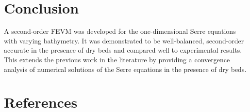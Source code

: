 \documentclass[times]{elsarticle}
\begin{document}
\section{Conclusion}
A second-order FEVM was developed for the one-dimensional Serre equations with varying bathymetry. It was demonstrated to be well-balanced, second-order accurate in the presence of dry beds and compared well to experimental results. This extends the previous work in the literature by providing a convergence analysis of numerical solutions of the Serre equations in the presence of dry beds. 



\section*{References}


\end{document}
